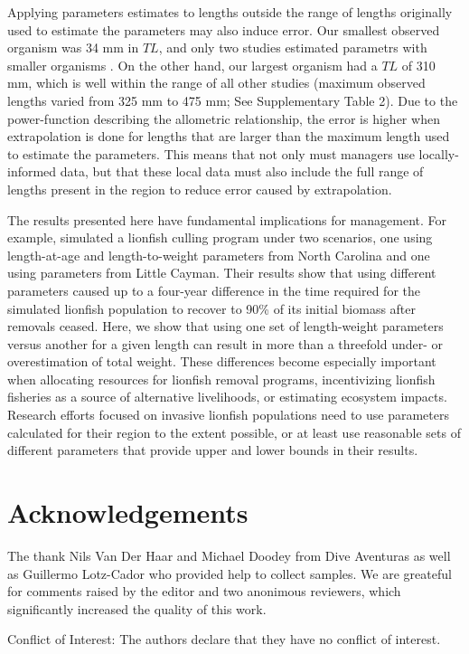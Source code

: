 \documentclass[fleqn,10pt,lineno]{wlpeerj} %
\begin{document}
Applying parameters estimates to lengths outside the range of lengths
originally used to estimate the parameters may also induce error. Our
smallest observed organism was 34 mm in \(TL\), and only two studies
estimated parametrs with smaller organisms
\citep{sabidoitza_2016,edwards_2014}. On the other hand, our largest
organism had a \(TL\) of 310 mm, which is well within the range of all
other studies (maximum observed lengths varied from 325 mm to 475 mm;
See Supplementary Table 2). Due to the power-function describing the
allometric relationship, the error is higher when extrapolation is done
for lengths that are larger than the maximum length used to estimate the
parameters. This means that not only must managers use locally-informed
data, but that these local data must also include the full range of
lengths present in the region to reduce error caused by extrapolation.

The results presented here have fundamental implications for management.
For example, \citet{edwards_2014} simulated a lionfish culling program
under two scenarios, one using length-at-age and length-to-weight
parameters from North Carolina and one using parameters from Little
Cayman. Their results show that using different parameters caused up to
a four-year difference in the time required for the simulated lionfish
population to recover to 90\% of its initial biomass after removals
ceased. Here, we show that using one set of length-weight parameters
versus another for a given length can result in more than a threefold
under- or overestimation of total weight. These differences become
especially important when allocating resources for lionfish removal
programs, incentivizing lionfish fisheries as a source of alternative
livelihoods, or estimating ecosystem impacts. Research efforts focused
on invasive lionfish populations need to use parameters calculated for
their region to the extent possible, or at least use reasonable sets of
different parameters that provide upper and lower bounds in their
results.

\section*{Acknowledgements}

The thank Nils Van Der Haar and Michael Doodey from Dive Aventuras as
well as Guillermo Lotz-Cador who provided help to collect samples. We
are greateful for comments raised by the editor and two anonimous
reviewers, which significantly increased the quality of this work.

Conflict of Interest: The authors declare that they have no conflict of
interest.


\end{document}
